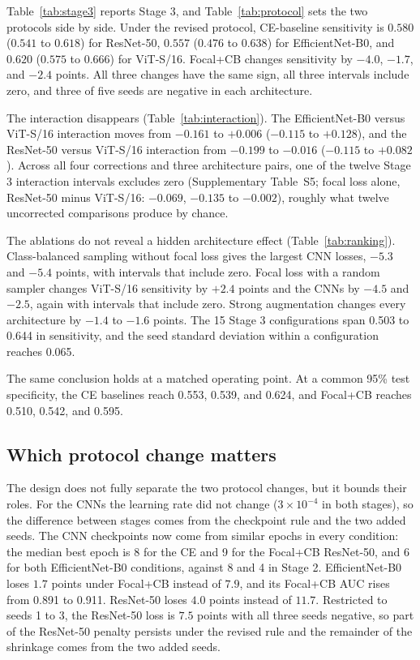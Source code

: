 Table~\ref{tab:stage3} reports Stage 3, and Table~\ref{tab:protocol} sets the two protocols side by side. Under the revised protocol, CE-baseline sensitivity is $0.580$ ($0.541$ to $0.618$) for ResNet-50, $0.557$ ($0.476$ to $0.638$) for EfficientNet-B0, and $0.620$ ($0.575$ to $0.666$) for ViT-S/16. Focal+CB changes sensitivity by $-4.0$, $-1.7$, and $-2.4$ points. All three changes have the same sign, all three intervals include zero, and three of five seeds are negative in each architecture.

The interaction disappears (Table~\ref{tab:interaction}). The EfficientNet-B0 versus ViT-S/16 interaction moves from $-0.161$ to $+0.006$ ($-0.115$ to $+0.128$), and the ResNet-50 versus ViT-S/16 interaction from $-0.199$ to $-0.016$ ($-0.115$ to $+0.082$). Across all four corrections and three architecture pairs, one of the twelve Stage 3 interaction intervals excludes zero (Supplementary Table~S5; focal loss alone, ResNet-50 minus ViT-S/16: $-0.069$, $-0.135$ to $-0.002$), roughly what twelve uncorrected comparisons produce by chance.

The ablations do not reveal a hidden architecture effect (Table~\ref{tab:ranking}). Class-balanced sampling without focal loss gives the largest CNN losses, $-5.3$ and $-5.4$ points, with intervals that include zero. Focal loss with a random sampler changes ViT-S/16 sensitivity by $+2.4$ points and the CNNs by $-4.5$ and $-2.5$, again with intervals that include zero. Strong augmentation changes every architecture by $-1.4$ to $-1.6$ points. The 15 Stage 3 configurations span 0.503 to 0.644 in sensitivity, and the seed standard deviation within a configuration reaches 0.065.

The same conclusion holds at a matched operating point. At a common 95\% test specificity, the CE baselines reach 0.553, 0.539, and 0.624, and Focal+CB reaches 0.510, 0.542, and 0.595.






\subsection{Which protocol change matters}

The design does not fully separate the two protocol changes, but it bounds their roles. For the CNNs the learning rate did not change ($3\times10^{-4}$ in both stages), so the difference between stages comes from the checkpoint rule and the two added seeds. The CNN checkpoints now come from similar epochs in every condition: the median best epoch is 8 for the CE and 9 for the Focal+CB ResNet-50, and 6 for both EfficientNet-B0 conditions, against 8 and 4 in Stage 2. EfficientNet-B0 loses $1.7$ points under Focal+CB instead of $7.9$, and its Focal+CB AUC rises from 0.891 to 0.911. ResNet-50 loses $4.0$ points instead of $11.7$. Restricted to seeds 1 to 3, the ResNet-50 loss is $7.5$ points with all three seeds negative, so part of the ResNet-50 penalty persists under the revised rule and the remainder of the shrinkage comes from the two added seeds.

